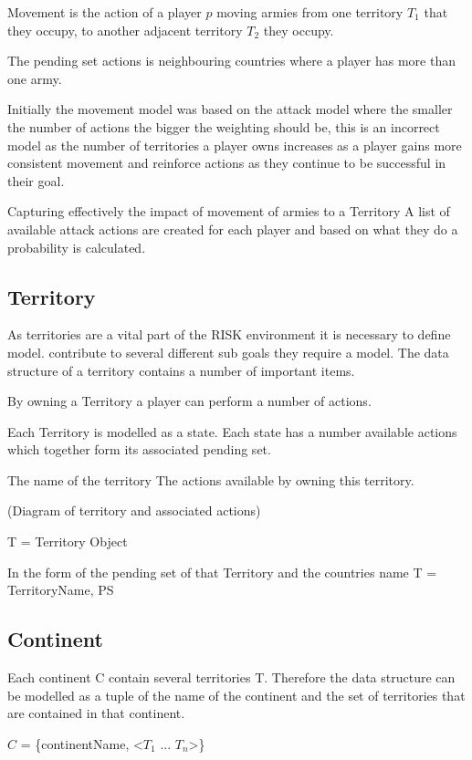 \documentclass[parskip]{cs4rep}
\begin{document}
Movement is the action of a player $p$ moving armies from one territory $T_{1}$ that they occupy, to another adjacent territory $T_{2}$ they occupy.

The pending set actions is neighbouring countries where a player has more than one army.

Initially the movement model was based on the attack model where the smaller the number of actions the bigger the weighting should be, this is an incorrect model as the number of territories a player owns increases as a player gains more consistent movement and reinforce actions as they continue to be successful in their goal.

Capturing effectively the impact of movement of armies to a Territory 
A list of available attack actions are created for each player and based on what they do a probability is calculated.

\subsection{Territory}

As territories are a vital part of the RISK environment it is necessary to define  model. contribute to several different sub goals they require a model. The data structure of a territory contains a number of important items.

By owning a Territory a player can perform a number of actions.

Each Territory is modelled as a state. Each state has a number available actions which together form its associated pending set.

The name of the territory
The actions available by owning this territory.

(Diagram of territory and associated actions)

T = Territory Object

In the form of the pending set of that Territory and the countries name T = { TerritoryName, PS }

\subsection{Continent}

Each continent C contain several territories T. Therefore the data structure can be modelled as a tuple of the name of the continent and the set of territories that are contained in that continent.

$C$ = \{continentName, <$T_{1}$ ... $T_{n}$>\}
\end{document}
